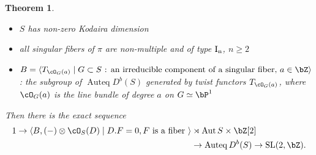 \documentclass[a0,landscape]{a0poster}
\theoremstyle{plain}
\newtheorem{theorem}{Theorem}[section]
\theoremstyle{definition}
\DeclareMathOperator{\Auteq}{\mathrm{Auteq}}
\DeclareMathOperator{\Aut}{\mathrm{Aut}}
\DeclareMathOperator{\SL}{\mathrm{SL}}
\begin{document}
\begin{multicols}{3}
    \begin{tcolorbox}[
            colback = blue!10!white,
            colframe = blue!10!white,
            fonttitle = \bfseries,
            breakable = true]
        \begin{theorem}
            \quad
            \begin{itemize}
                \item $S$ has non-zero Kodaira dimension
                \item all singular fibers of $\pi$ are non-multiple and of type $\rm{I}_n$, $n \geq 2$
                \item  $B = \langle T_{\cO_G(a)} \mid G \subset S \text{ : an irreducible component of a singular fiber, } a \in \bZ \rangle$ : the subgroup of $\Auteq D^b(S)$ generated by twist functors $T_{\cO_G(a)}$, where $\cO_G(a)$ is the line bundle of degree $a$ on $G \simeq \bP^1$
            \end{itemize}

            Then there is the exact sequence
            \begin{align*}
                1 \to \langle B, (-)\otimes \cO_S(D)\mid D.F=0, F \textrm{ is a fiber } \rangle & \rtimes \Aut{S} \times \bZ[2]      \\
                                                                                                & \to \Auteq{D^b(S)} \to \SL(2,\bZ).
            \end{align*}
        \end{theorem}
    \end{tcolorbox}



    \color{Green}

\end{multicols}
\end{document}
